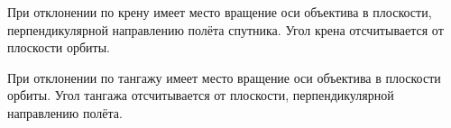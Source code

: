 \begin{enumerate}
    При отклонении по крену имеет место вращение оси объектива в плоскости, перпендикулярной направлению полёта 
    спутника. Угол крена отсчитывается от плоскости орбиты. 

    При отклонении по тангажу имеет место вращение оси объектива в плоскости орбиты. Угол тангажа отсчитывается 
    от плоскости, перпендикулярной направлению полёта.
\end{enumerate}